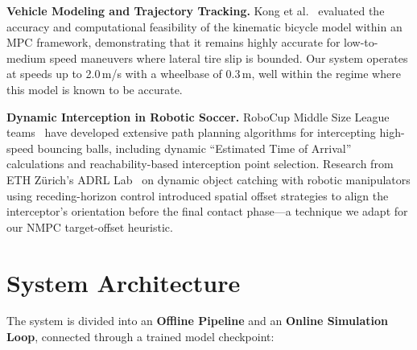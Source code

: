 \documentclass[10pt,twocolumn,letterpaper]{article}
\begin{document}
\textbf{Vehicle Modeling and Trajectory Tracking.}
Kong et al.~\cite{kong2015kinematic} evaluated the accuracy and
computational feasibility of the kinematic bicycle model within an MPC
framework, demonstrating that it remains highly accurate for
low-to-medium speed maneuvers where lateral tire slip is bounded. Our
system operates at speeds up to 2.0\,m/s with a wheelbase of
0.3\,m, well within the regime where this model is known to be
accurate.

\textbf{Dynamic Interception in Robotic Soccer.}
RoboCup Middle Size League teams~\cite{techunited2023robocup} have
developed extensive path planning algorithms for intercepting
high-speed bouncing balls, including dynamic ``Estimated Time of
Arrival'' calculations and reachability-based interception point
selection. Research from ETH Z\"urich's ADRL
Lab~\cite{adrl2021dynamic} on dynamic object catching with robotic
manipulators using receding-horizon control introduced spatial offset
strategies to align the interceptor's orientation before the final
contact phase---a technique we adapt for our NMPC target-offset
heuristic.

\section{System Architecture}

The system is divided into an \textbf{Offline Pipeline} and an
\textbf{Online Simulation Loop}, connected through a trained model
checkpoint:
\end{document}
